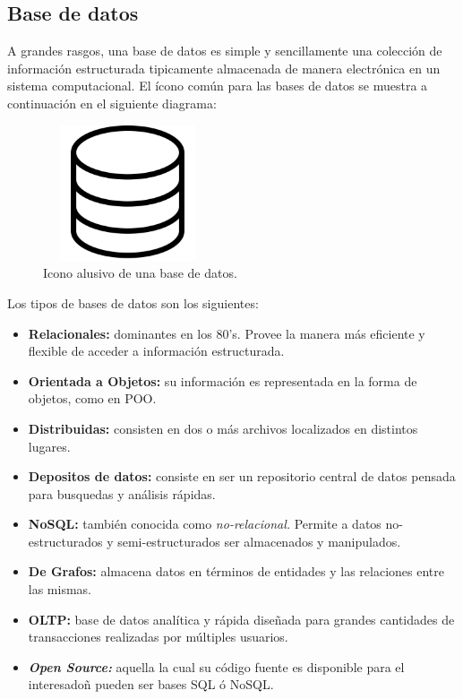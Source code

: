 \documentclass[letterpaper, 12pt]{article}
\begin{document}
\begin{justify}
            \subsection{Base de datos}
        \justify
        A grandes rasgos, una base de datos es simple y sencillamente una colección de información estructurada tipicamente almacenada de manera
        electrónica en un sistema computacional. El ícono común para las bases de datos se muestra a continuación en el siguiente diagrama:
        \begin{figure}[H]
            \centering
            \includegraphics[width=5cm,height=4cm]{database_icon.png}
            \caption{Icono alusivo de una base de datos.}
        \end{figure}
        Los tipos de bases de datos son los siguientes:
        \begin{itemize}
            \item \textbf{Relacionales:} dominantes en los 80's. Provee la manera más eficiente y flexible de acceder a información estructurada.
            \item \textbf{Orientada a Objetos:} su información es representada en la forma de objetos, como en POO.
            \item \textbf{Distribuidas:} consisten en dos o más archivos localizados en distintos lugares.
            \item \textbf{Depositos de datos:} consiste en ser un repositorio central de datos pensada para busquedas y análisis rápidas.
            \item \textbf{NoSQL:} también conocida como \emph{no-relacional.} Permite a datos no-estructurados y semi-estructurados ser almacenados y manipulados.
            \item \textbf{De Grafos:} almacena datos en términos de entidades y las relaciones entre las mismas.
            \item \textbf{OLTP:} base de datos analítica y rápida diseñada para grandes cantidades de transacciones realizadas por múltiples usuarios. 
            \item \textbf{\emph{Open Source:}} aquella la cual su código fuente es disponible para el interesadoñ pueden ser bases SQL ó NoSQL.

\end{itemize}
\end{justify}
\end{document}
